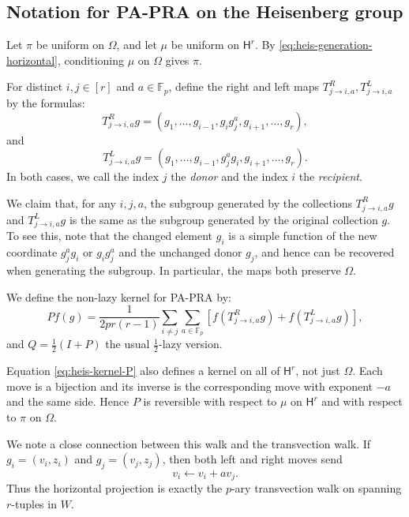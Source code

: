 \documentclass[11pt, reqno]{amsart}
\numberwithin{equation}{section}
\newcommand{\Fp}{\mathbb F_p}
\newcommand{\Heis}{\mathsf H}
\begin{document}


\subsection{Notation for PA-PRA on the Heisenberg group}\label{subsec:heis-chain}


Let \(\pi\) be uniform on \(\Omega\), and let \(\mu\) be uniform on
\(\Heis^r\).  By \eqref{eq:heis-generation-horizontal}, conditioning \(\mu\) on
\(\Omega\) gives \(\pi\).

For distinct \(i,j\in[r]\) and \(a\in\Fp\), define the right and left maps $T^R_{j\to i,a},T^L_{j\to i,a}$ by the formulas:
\[
    T^R_{j\to i,a}g
    =(g_1,\ldots,g_{i-1},g_i g_j^a,g_{i+1},\ldots,g_r),
\]
and
\[
    T^L_{j\to i,a}g
    =(g_1,\ldots,g_{i-1},g_j^a g_i,g_{i+1},\ldots,g_r).
\]
In both cases, we call the index \(j\) the \textit{donor} and the index \(i\) the \textit{recipient}. 


We claim that, for any $i,j,a$, the subgroup generated by the collections $T^R_{j\to i,a}g$ and $T^L_{j\to i,a}g$ is the same as the subgroup generated by the original collection $g$. To see this, note that the changed element \(g_i\) is a simple function of  the new
coordinate $g_j^a g_i$ or $g_{i} g_j^a$ and the unchanged donor $g_{j}$, and hence can be recovered when generating the subgroup. In particular, the maps both preserve \(\Omega\).

We define the non-lazy kernel for PA-PRA by:
\begin{equation}\label{eq:heis-kernel-P}
    Pf(g)=\frac1{2pr(r-1)}
    \sum_{i\ne j}\sum_{a\in\Fp}
    \left[f(T^R_{j\to i,a}g)+f(T^L_{j\to i,a}g)\right],
\end{equation}
and $Q = \frac{1}{2}(I + P)$ the usual $\frac{1}{2}$-lazy version.


Equation \eqref{eq:heis-kernel-P} also defines a kernel on all of \(\Heis^r\), not just $\Omega$.  Each move is a
bijection and its inverse is the corresponding move with exponent \(-a\) and
the same side.  Hence \(P\) is reversible with respect to \(\mu\) on
\(\Heis^r\) and with respect to \(\pi\) on \(\Omega\). 

We note a close connection between this walk and the transvection walk. If \(g_i=(v_i,z_i)\) and \(g_j=(v_j,z_j)\), then both left and right moves send
\begin{equation}\label{eq:heis-horizontal-update}
    v_i\leftarrow v_i+a v_j.
\end{equation}
Thus the horizontal projection is exactly the \(p\)-ary transvection walk on spanning
\(r\)-tuples in \(W\).
\end{document}
